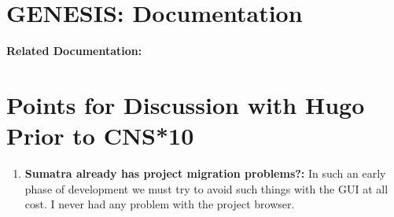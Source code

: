 \documentclass[12pt]{article}
\begin{document}
\section*{GENESIS: Documentation}

{\bf Related Documentation:}

\section*{Points for Discussion with Hugo Prior to CNS*10}

\begin{enumerate}
\item {\bf Sumatra already has project migration problems?:} In such an early phase of development we must try to avoid such things
with the GUI at all cost.  I never had any problem with the project browser.


\end{enumerate}
\end{document}
